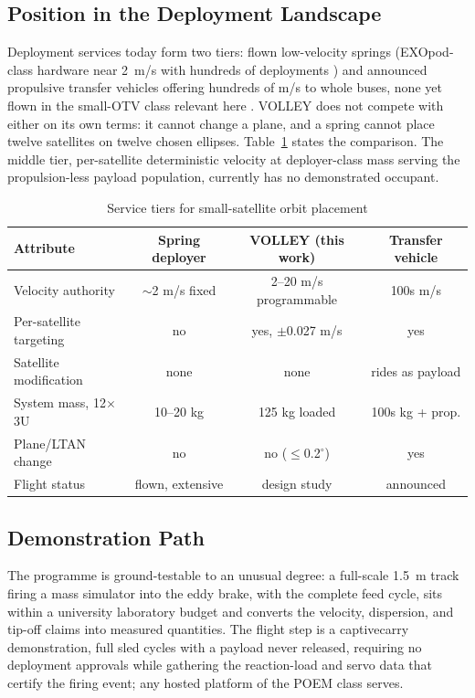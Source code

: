 \documentclass[conference]{IEEEtran}
\begin{document}
\subsection{Position in the Deployment Landscape}
Deployment services today form two tiers: flown low-velocity springs (EXOpod-class hardware near 2~m/s with hundreds of deployments \cite{exopod}) and announced propulsive transfer vehicles offering hundreds of m/s to whole buses, none yet flown in the small-OTV class relevant here \cite{pushpak}. VOLLEY does not compete with either on its own terms: it cannot change a plane, and a spring cannot place twelve satellites on twelve chosen ellipses. Table~\ref{tab:tier} states the comparison. The middle tier, per-satellite deterministic velocity at deployer-class mass serving the propulsion-less payload population, currently has no demonstrated occupant.

\begin{table}[t]
\caption{Service tiers for small-satellite orbit placement}
\label{tab:tier}
\centering\scriptsize
\begin{tabular}{lccc}
\toprule
Attribute & Spring deployer & VOLLEY (this work) & Transfer vehicle\\
\midrule
Velocity authority & $\sim$2 m/s fixed & 2--20 m/s programmable & 100s m/s\\
Per-satellite targeting & no & yes, $\pm$0.027 m/s & yes\\
Satellite modification & none & none & rides as payload\\
System mass, 12$\times$3U & 10--20 kg & 125 kg loaded & 100s kg + prop.\\
Plane/LTAN change & no & no ($\le$0.2$^\circ$) & yes\\
Flight status & flown, extensive & design study & announced\\
\bottomrule
\end{tabular}
\end{table}

\subsection{Demonstration Path}
The programme is ground-testable to an unusual degree: a full-scale 1.5~m track firing a mass simulator into the eddy brake, with the complete feed cycle, sits within a university laboratory budget and converts the velocity, dispersion, and tip-off claims into measured quantities. The flight step is a captive\-carry demonstration, full sled cycles with a payload never released, requiring no deployment approvals while gathering the reaction-load and servo data that certify the firing event; any hosted platform of the POEM class serves.
\end{document}
